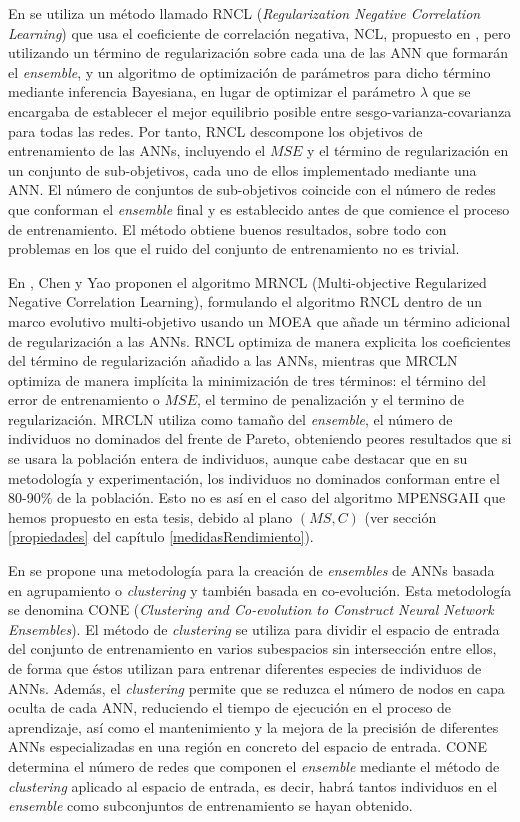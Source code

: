 En \cite{Chen2009} se utiliza un método llamado RNCL (\textit{Regularization Negative
Correlation Learning}) que usa el coeficiente de correlación negativa, NCL,
propuesto en \cite{Liu1999}, pero utilizando un término de regularización sobre cada una
de las ANN que formarán el \textit{ensemble}, y un algoritmo de optimización de parámetros
para dicho término mediante inferencia Bayesiana, en lugar de optimizar el parámetro
$\lambda$ que se encargaba de establecer el mejor equilibrio posible entre
sesgo-varianza-covarianza para todas las redes. Por tanto, RNCL descompone los objetivos
de entrenamiento de las ANNs, incluyendo el $MSE$ y el término de regularización en un
conjunto de sub-objetivos, cada uno de ellos implementado mediante una ANN. El número de
conjuntos de sub-objetivos coincide con el número de redes que conforman el
\textit{ensemble} final y es establecido antes de que comience el proceso de entrenamiento. El
método obtiene
buenos resultados, sobre todo con problemas en los que el ruido del conjunto de
entrenamiento no es trivial.

En \cite{Chen2010}, Chen y Yao proponen el algoritmo MRNCL (Multi-objective Regularized
Negative Correlation Learning), formulando el algoritmo RNCL \cite{Chen2009} dentro de
un marco evolutivo multi-objetivo usando un MOEA que añade un término adicional de
regularización a las ANNs. RNCL optimiza de manera explicita los coeficientes del término
de regularización añadido a las ANNs, mientras que MRCLN optimiza de manera implícita la
minimización de tres términos: el término del error de entrenamiento o $MSE$, el termino
de penalización y el termino de regularización. MRCLN utiliza como tamaño del
\textit{ensemble}, el número de individuos no dominados del frente de Pareto,
obteniendo peores resultados que si se usara la población entera de individuos, aunque
cabe destacar que en su metodología y experimentación, los individuos no dominados
conforman entre el 80-90\% de la población. Esto no es así en el caso del algoritmo
MPENSGAII que hemos propuesto en esta tesis, debido
al plano $(MS,C)$ (ver sección \ref{propiedades} del capítulo
\ref{medidasRendimiento}).

En \cite{Minku2008} se propone una metodología para la creación de
\textit{ensembles} de ANNs basada en agrupamiento o
\textit{clustering} y también basada en co-evolución. Esta metodología se denomina CONE
(\textit{Clustering and Co-evolution to Construct Neural Network Ensembles}).
El método de \textit{clustering} se utiliza para dividir el espacio de entrada del
conjunto
de entrenamiento en varios subespacios sin intersección entre ellos, de forma que éstos
utilizan para entrenar diferentes especies de individuos de ANNs. Además, el
\textit{clustering} permite que se reduzca el número de nodos en capa oculta de
cada ANN, reduciendo el tiempo de ejecución en el proceso de aprendizaje, así como el
mantenimiento y la mejora de la precisión de diferentes ANNs especializadas en una región
en concreto del espacio de entrada. CONE determina el número de redes que componen el
\textit{ensemble} mediante el método de \textit{clustering} aplicado al espacio de
entrada, es
decir, habrá tantos individuos en el \textit{ensemble} como subconjuntos de entrenamiento
se hayan obtenido.

